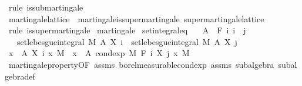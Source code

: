 \begin{isabellebody}
%
\isatagproof
{}\isamarkupfalse%
\ {\isacharparenleft}{\kern0pt}rule\ is{\isacharunderscore}{\kern0pt}submartingale{\isacharparenright}{\kern0pt}%
\endisatagproof
{\isafoldproof}%
%
\isadelimproof
%
\endisadelimproof
\isanewline
\isanewline
{}\isamarkupfalse%
\ martingale{\isacharunderscore}{\kern0pt}lattice\ {\isasymsubseteq}\ martingale{\isacharunderscore}{\kern0pt}is{\isacharunderscore}{\kern0pt}supermartingale{\isacharcolon}{\kern0pt}\ supermartingale{\isacharunderscore}{\kern0pt}lattice%
\isadelimproof
\ %
\endisadelimproof
%
\isatagproof
{}\isamarkupfalse%
\ {\isacharparenleft}{\kern0pt}rule\ is{\isacharunderscore}{\kern0pt}supermartingale{\isacharparenright}{\kern0pt}%
\endisatagproof
{\isafoldproof}%
%
\isadelimproof
%
\endisadelimproof
\isanewline
\isanewline
{}\isamarkupfalse%
\ martingale\isanewline
{}\isanewline
\isanewline
{}\isamarkupfalse%
\ set{\isacharunderscore}{\kern0pt}integral{\isacharunderscore}{\kern0pt}eq{\isacharcolon}{\kern0pt}\isanewline
\ \ \ {\isachardoublequoteopen}A\ {\isasymin}\ F\ i{\isachardoublequoteclose}\ {\isachardoublequoteopen}i\ {\isasymle}\ j{\isachardoublequoteclose}\isanewline
\ \ \ {\isachardoublequoteopen}set{\isacharunderscore}{\kern0pt}lebesgue{\isacharunderscore}{\kern0pt}integral\ M\ A\ {\isacharparenleft}{\kern0pt}X\ i{\isacharparenright}{\kern0pt}\ {\isacharequal}{\kern0pt}\ set{\isacharunderscore}{\kern0pt}lebesgue{\isacharunderscore}{\kern0pt}integral\ M\ A\ {\isacharparenleft}{\kern0pt}X\ j{\isacharparenright}{\kern0pt}{\isachardoublequoteclose}\isanewline
%
\isadelimproof
%
\endisadelimproof
%
\isatagproof
{}\isamarkupfalse%
\ {\isacharminus}{\kern0pt}\isanewline
\ \ \isamarkupfalse%
\ {\isachardoublequoteopen}{\isasymintegral}x\ {\isasymin}\ A{\isachardot}{\kern0pt}\ X\ i\ x\ {\isasympartial}M\ {\isacharequal}{\kern0pt}\ {\isasymintegral}x\ {\isasymin}\ A{\isachardot}{\kern0pt}\ cond{\isacharunderscore}{\kern0pt}exp\ M\ {\isacharparenleft}{\kern0pt}F\ i{\isacharparenright}{\kern0pt}\ {\isacharparenleft}{\kern0pt}X\ j{\isacharparenright}{\kern0pt}\ x\ {\isasympartial}M{\isachardoublequoteclose}\ \isamarkupfalse%
\ martingale{\isacharunderscore}{\kern0pt}property{\isacharbrackleft}{\kern0pt}OF\ assms{\isacharparenleft}{\kern0pt}{}{\isacharparenright}{\kern0pt}{\isacharbrackright}{\kern0pt}\ borel{\isacharunderscore}{\kern0pt}measurable{\isacharunderscore}{\kern0pt}cond{\isacharunderscore}{\kern0pt}exp{\isacharprime}{\kern0pt}\ assms{\isacharparenleft}{\kern0pt}{}{\isacharparenright}{\kern0pt}\ subalgebra\ subalgebra{\isacharunderscore}{\kern0pt}def\ \isamarkupfalse%

\end{isabellebody}
